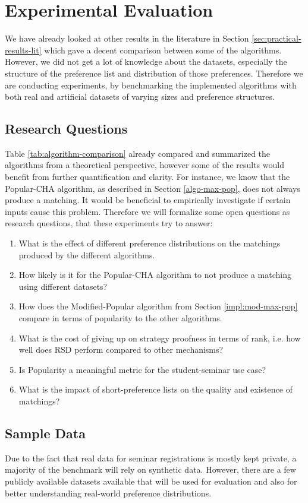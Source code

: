\section{Experimental Evaluation}\label{sec:evaluation}
We have already looked at other results in the literature in Section \ref{sec:practical-results-lit} which gave a decent comparison between some of the algorithms. However, we did not get a lot of knowledge about the datasets, especially the structure of the preference list and distribution of those preferences. Therefore we are conducting experiments, by benchmarking the implemented algorithms with both real and artificial datasets of varying sizes and preference structures.

\subsection{Research Questions}\label{sec:research-q}
Table \ref{tab:algorithm-comparison} already compared and summarized the algorithms from a theoretical perspective, however some of the results would benefit from further quantification and clarity. For instance, we know that the Popular-CHA algorithm, as described in Section \ref{algo-max-pop}, does not always produce a matching. It would be beneficial to empirically investigate if certain inputs cause this problem. Therefore we will formalize some open questions as research questions, that these experiments try to answer:
\begin{enumerate}
    \item What is the effect of different preference distributions on the matchings produced by the different algorithms.
    \item How likely is it for the Popular-CHA algorithm to not produce a matching using different datasets?
    \item How does the Modified-Popular algorithm from Section \ref{impl:mod-max-pop} compare in terms of popularity to the other algorithms.
    \item What is the cost of giving up on strategy proofness in terms of rank, i.e. how well does RSD perform compared to other mechanisms?
    \item Is Popularity a meaningful metric for the student-seminar use case?
    \item What is the impact of short-preference lists on the quality and existence of matchings?
\end{enumerate}

\subsection{Sample Data}
Due to the fact that real data for seminar registrations is mostly kept private, a majority of the benchmark will rely on synthetic data. However, there are a few publicly available datasets available that will be used for evaluation and also for better understanding real-world preference distributions.

